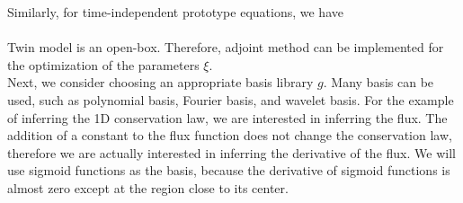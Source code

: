 \documentclass[a4paper,onecolumn]{article}
\theoremstyle{remark}
\begin{document}
\noindent Similarly, for time-independent prototype equations, we have\\

\\

\noindent Twin model is an open-box. Therefore, adjoint method 
can be implemented for the optimization of the parameters $\xi$.\\

\noindent Next, we consider choosing an appropriate basis library $g$.
Many basis can be used, such as polynomial basis, Fourier basis, and wavelet basis.
For the example of inferring the 1D conservation law, we are interested in inferring the flux.
The addition of a constant to the flux function does not change the conservation law,
therefore we are actually interested in inferring the derivative of the flux.
We will use sigmoid functions as the basis, because the derivative of sigmoid functions
is almost zero except at the region close to its center.\\
\end{document}
